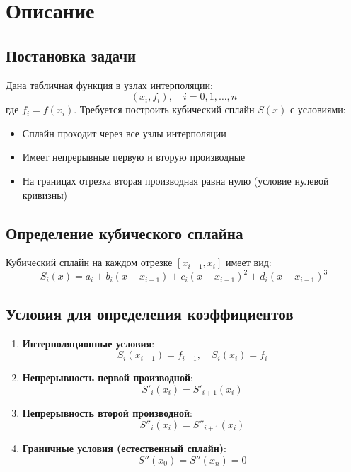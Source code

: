 
\section*{Описание}

\subsection*{Постановка задачи}
Дана табличная функция в узлах интерполяции:
\[ (x_i, f_i), \quad i = 0,1,\ldots,n \]
где $f_i = f(x_i)$. Требуется построить кубический сплайн $S(x)$ с условиями:
\begin{itemize}
    \item Сплайн проходит через все узлы интерполяции
    \item Имеет непрерывные первую и вторую производные
    \item На границах отрезка вторая производная равна нулю (условие нулевой кривизны)
\end{itemize}

\subsection*{Определение кубического сплайна}
Кубический сплайн на каждом отрезке $[x_{i-1}, x_i]$ имеет вид:
\[ S_i(x) = a_i + b_i(x-x_{i-1}) + c_i(x-x_{i-1})^2 + d_i(x-x_{i-1})^3 \]

\subsection*{Условия для определения коэффициентов}
\begin{enumerate}
    \item \textbf{Интерполяционные условия}:
    \[ S_i(x_{i-1}) = f_{i-1}, \quad S_i(x_i) = f_i \]
    
    \item \textbf{Непрерывность первой производной}:
    \[ S'_i(x_i) = S'_{i+1}(x_i) \]
    
    \item \textbf{Непрерывность второй производной}:
    \[ S''_i(x_i) = S''_{i+1}(x_i) \]
    
    \item \textbf{Граничные условия (естественный сплайн)}:
    \[ S''(x_0) = S''(x_n) = 0 \]
\end{enumerate}


